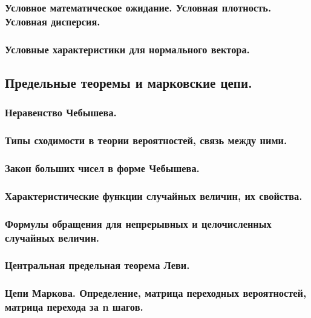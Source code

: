 \documentclass[14pt]{extarticle}
\theoremstyle{breakstyle}
\begin{document}
\subsubsection{Условное математическое ожидание. Условная плотность. Условная дисперсия.}

\subsubsection{Условные характеристики для нормального вектора.}


\subsection{Предельные теоремы и марковские цепи.}

\subsubsection{Неравенство Чебышева.}

\subsubsection{Типы сходимости в теории вероятностей, связь между ними.}

\subsubsection{Закон больших чисел в форме Чебышева.}

\subsubsection{Характеристические функции случайных величин, их свойства.}

\subsubsection{Формулы обращения для непрерывных и целочисленных случайных величин.}

\subsubsection{Центральная предельная теорема Леви.}

\subsubsection{Цепи Маркова. Определение, матрица переходных вероятностей, матрица перехода за n шагов.}
\end{document}
